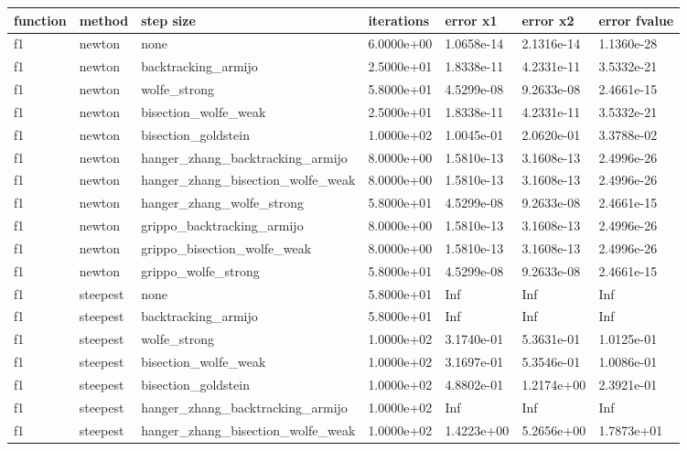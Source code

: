 \documentclass[a4paper,11pt]{article}
\numberwithin{equation}{section} %
\begin{document}
\begin{longtable}{p{1.5cm}|p{1.5cm}|p{4cm}|p{2cm}|p{2cm}|p{2cm}|p{2cm}}
        function & method & step size & iterations & error x1 & error x2 & error fvalue \\ \hline
        f1 & newton & none & 6.0000e+00 & 1.0658e-14 & 2.1316e-14 & 1.1360e-28 \\
        f1 & newton & backtracking\_armijo & 2.5000e+01 & 1.8338e-11 & 4.2331e-11 & 3.5332e-21 \\
        f1 & newton & wolfe\_strong & 5.8000e+01 & 4.5299e-08 & 9.2633e-08 & 2.4661e-15 \\
        f1 & newton & bisection\_wolfe\_weak & 2.5000e+01 & 1.8338e-11 & 4.2331e-11 & 3.5332e-21 \\
        f1 & newton & bisection\_goldstein & 1.0000e+02 & 1.0045e-01 & 2.0620e-01 & 3.3788e-02 \\
        f1 & newton & hanger\_zhang\_backtracking\_armijo & 8.0000e+00 & 1.5810e-13 & 3.1608e-13 & 2.4996e-26 \\
        f1 & newton & hanger\_zhang\_bisection\_wolfe\_weak & 8.0000e+00 & 1.5810e-13 & 3.1608e-13 & 2.4996e-26 \\
        f1 & newton & hanger\_zhang\_wolfe\_strong & 5.8000e+01 & 4.5299e-08 & 9.2633e-08 & 2.4661e-15 \\
        f1 & newton & grippo\_backtracking\_armijo & 8.0000e+00 & 1.5810e-13 & 3.1608e-13 & 2.4996e-26 \\
        f1 & newton & grippo\_bisection\_wolfe\_weak & 8.0000e+00 & 1.5810e-13 & 3.1608e-13 & 2.4996e-26 \\
        f1 & newton & grippo\_wolfe\_strong & 5.8000e+01 & 4.5299e-08 & 9.2633e-08 & 2.4661e-15 \\
        f1 & steepest & none & 5.8000e+01 & Inf & Inf & Inf \\
        f1 & steepest & backtracking\_armijo & 5.8000e+01 & Inf & Inf & Inf \\
        f1 & steepest & wolfe\_strong & 1.0000e+02 & 3.1740e-01 & 5.3631e-01 & 1.0125e-01 \\
        f1 & steepest & bisection\_wolfe\_weak & 1.0000e+02 & 3.1697e-01 & 5.3546e-01 & 1.0086e-01 \\
        f1 & steepest & bisection\_goldstein & 1.0000e+02 & 4.8802e-01 & 1.2174e+00 & 2.3921e-01 \\
        f1 & steepest & hanger\_zhang\_backtracking\_armijo & 1.0000e+02 & Inf & Inf & Inf \\
        f1 & steepest & hanger\_zhang\_bisection\_wolfe\_weak & 1.0000e+02 & 1.4223e+00 & 5.2656e+00 & 1.7873e+01 \\

\end{longtable}
\end{document}
